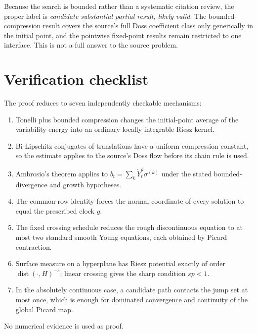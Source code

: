 \documentclass[11pt]{article}
\DeclareMathOperator{\dist}{dist}
\begin{document}
Because the search is bounded rather than a systematic citation review, the
proper label is \emph{candidate substantial partial result, likely valid}.
The bounded-compression result covers the source's full Doss coefficient class
only generically in the initial point, and the pointwise fixed-point results
remain restricted to one interface.  This is not a full answer to the source
problem.

\section{Verification checklist}

The proof reduces to seven independently checkable mechanisms:
\begin{enumerate}
\item Tonelli plus bounded compression changes the initial-point average of
the variability energy into an ordinary locally integrable Riesz kernel.
\item Bi-Lipschitz conjugates of translations have a uniform compression
constant, so the estimate applies to the source's Doss flow before its chain
rule is used.
\item Ambrosio's theorem applies to
$b_t=\sum_k\dot Y_t^k\sigma^{(k)}$ under the stated bounded-divergence and
growth hypotheses.
\item The common-row identity forces the normal coordinate of every solution
to equal the prescribed clock $g$.
\item The fixed crossing schedule reduces the rough discontinuous equation to
at most two standard smooth Young equations, each obtained by Picard
contraction.
\item Surface measure on a hyperplane has Riesz potential exactly of order
$\dist(\cdot,H)^{-s}$; linear crossing gives the sharp condition $sp<1$.
\item In the absolutely continuous case, a candidate path contacts the jump
set at most once, which is enough for dominated convergence and continuity of
the global Picard map.
\end{enumerate}
No numerical evidence is used as proof.
\end{document}
